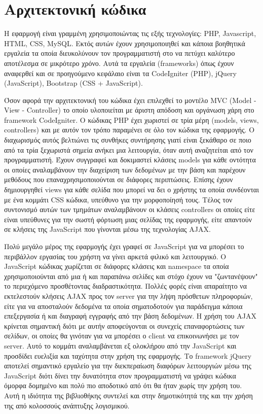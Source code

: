 

\section{Αρχιτεκτονική κώδικα}
Η εφαρμογή είναι γραμμένη χρησιμοποιώντας τις εξής τεχνολογίες: PHP, Javascript, HTML, CSS, MySQL. Εκτός αυτών έχουν χρησιμοποιηθεί και κάποια βοηθητικά εργαλεία τα οποία διευκολύνουν τον προγραμματιστή στο να πετύχει καλύτερο αποτέλεσμα σε μικρότερο χρόνο. Αυτά τα εργαλεία (frameworks) όπως έχουν αναφερθεί και σε προηγούμενο κεφάλαιο είναι τα CodeIgniter (PHP), jQuery (JavaScript), Bootstrap (CSS + JavaScript). 

Όσον αφορά την αρχιτεκτονική του κώδικα έχει επιλεχθεί το μοντέλο MVC (Model - View - Controller) το οποίο υλοποιείται με άριστη απόδοση και οργάνωση χάρη στο framework CodeIgniter. Ο κώδικας PHP έχει χωριστεί σε τρία μέρη (models, views, controllers) και με αυτόν τον τρόπο παραμένει σε όλο τον κώδικα της εφαρμογής. Ο διαχωρισμός αυτός βελτιώνει τις συνθήκες συντήρησης γιατί είναι ξεκάθαρο σε ποιο από τα τρία ξεχωριστά σημεία ανήκει μια λειτουργία, όταν αυτή αναζητείται από τον προγραμματιστή. Έχουν συγγραφεί και δοκιμαστεί κλάσεις models για κάθε οντότητα οι οποίες αναλαμβάνουν την διαχείριση των δεδομένων με την βάση και παρέχουν μεθόδους που επαναχρησιμοποιούνται σε διάφορες περιπτώσεις. Επίσης έχουν δημιουργηθεί views για κάθε σελίδα που μπορεί να δει ο χρήστης τα οποία συνδέονται με ένα κομμάτι CSS κώδικα, υπεύθυνο για την μορφοποίησή τους. Τέλος τον συντονισμό αυτών των τμημάτων αναλαμβάνουν οι κλάσεις controllers οι οποίες είτε είναι υπεύθυνες για την σωστή φόρτωση μιας σελίδας της εφαρμογής, είτε απαντούν σε κλήσεις της JavaScript που γίνονται μέσω της τεχνολογίας AJAX.

Πολύ μεγάλο μέρος της εφαρμογής έχει γραφεί σε JavaScript για να μπορέσει το περιβάλλον εργασίας του χρήστη να γίνει αρκετά φιλικό και λειτουργικό. Ο JavaScript κώδικας χωρίζεται σε διάφορες κλάσεις και namespace τα οποία χρησιμοποιούνται από μια ή και παραπάνω σελίδες και στόχο έχουν να "ζωντανέψουν" το περιεχόμενο προσθέτοντας διαδραστικότητα. Πολλές φορές είναι απαραίτητο να εκτελεστούν κλήσεις AJAX προς τον server για την λήψη πρόσθετων πληροφοριών, είτε για να αποσταλούν δεδομένα τα οποία σηματοδοτούν για παράδειγμα κάποια επεξεργασία ή και διαγραφή εγγραφής από την βάση δεδομένων. Η χρήση του AJAX κρίνεται σημαντική διότι με αυτήν αποφεύγονται οι συνεχείς επαναφορτώσεις των σελίδων, οι οποίες θα γινόταν για να μπορέσει ο client να επικοινωνήσει με τον server. Αυτό το κομμάτι αναλαμβάνεται εξ ολοκλήρου από την JavaScript και προσδίδει ευελιξία και ταχύτητα στην χρήση της εφαρμογής. Το framework jQuery αποτελεί σημαντικό εργαλείο για την διεκπεραίωση διαφόρων λειτουργιών μέσω της JavaScript διότι δίνει την δυνατότητα στον προγραμματιστή να γράψει κώδικα όμορφα δομημένο και πολύ πιο αποδοτικό από ότι θα ήταν χωρίς την χρήση του. Αυτή η ιδιότητα της βιβλιοθήκης συντελεί και στην δημοτικότητά της και την χρήση της από κολοσσούς ανάπτυξης λογισμικού.

